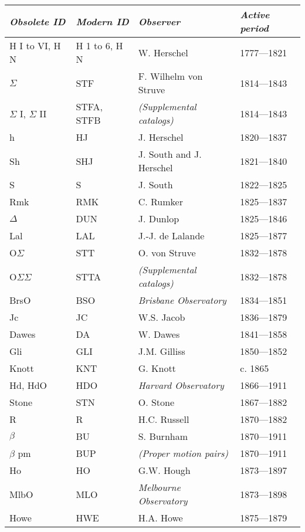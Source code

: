 \begin{longtable}{l|l|l|p{35mm}}\toprule
\emph{Obsolete ID} & \emph{Modern ID} & \emph{Observer} & \emph{Active period}\\\midrule
H I to VI, H N		& H 1 to 6, H N  & W. Herschel 		  	& 1777---1821 \\
$\Sigma$        	& STF 		 & F. Wilhelm von Struve        & 1814---1843 \\
$\Sigma$ I, $\Sigma$ II & STFA, STFB 	 & \emph{(Supplemental catalogs)} & 1814---1843 \\
h   	        	& HJ  		 & J. Herschel 		  	& 1820---1837 \\
Sh   	        	& SHJ 		 & J. South and J. Herschel  	& 1821---1840 \\
S  	  	        & S   		 & J. South 			& 1822---1825 \\
Rmk 	  	        & RMK 		 & C. Rumker			& 1825---1837 \\
$\Delta$		& DUN 		 & J. Dunlop 			& 1825---1846 \\
Lal  		        & LAL 		 & J.-J. de Lalande		& 1825---1877 \\
O$\Sigma$       	& STT 		 & O. von Struve		& 1832---1878 \\
O$\Sigma\Sigma$ 	& STTA 		 & \emph{(Supplemental catalogs)} & 1832---1878 \\
BrsO	        	& BSO 		 & \emph{Brisbane Observatory}	& 1834---1851 \\
Jc   	        	& JC  		 & W.S. Jacob 			& 1836---1879 \\
Dawes 	        	& DA  		 & W. Dawes 			& 1841---1858 \\
Gli 	 	        & GLI 		 & J.M. Gilliss 		& 1850---1852 \\
Knott  	        	& KNT 		 & G. Knott 			& c. 1865 \\
Hd, HdO   	        & HDO 		 & \emph{Harvard Observatory} 	& 1866---1911 \\
Stone  	       		& STN 		 & O. Stone			& 1867---1882 \\
R   	        	& R   		 & H.C. Russell 		& 1870---1882 \\
$\beta$   		& BU  		 & S. Burnham 			& 1870---1911 \\
$\beta$ pm 		& BUP 		 & \emph{(Proper motion pairs)} & 1870---1911 \\
Ho   	        	& HO  		 & G.W. Hough 			& 1873---1897 \\
MlbO  	        	& MLO 		 & \emph{Melbourne Observatory} & 1873---1898 \\
Howe   	        	& HWE 		 & H.A. Howe 			& 1875---1879 \\

\end{longtable}

